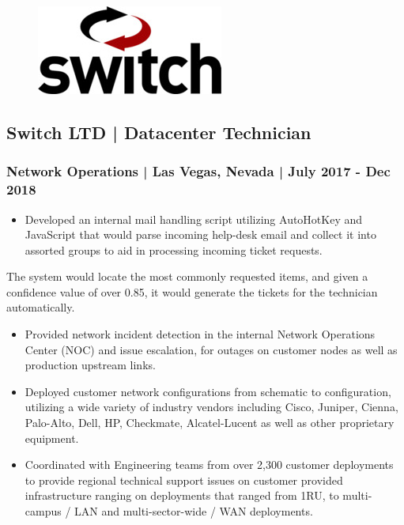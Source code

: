 \documentclass[letter,10pt]{article}
\begin{document}
\begin{figure}
\includegraphics[width=0.8\linewidth]{./img/50p_cr_switch.jpg}
\end{figure}

\subsection*{Switch LTD | Datacenter Technician}
\label{sec:orga775a4d}
\subsubsection*{Network Operations | Las Vegas, Nevada | July 2017 - Dec 2018}
\label{sec:org10a99c5}
\begin{itemize}
\item Developed an internal mail handling script utilizing AutoHotKey and JavaScript that would parse incoming help-desk email and collect it into assorted groups to aid in processing incoming ticket requests.
\end{itemize}
The system would locate the most commonly requested items, and given a confidence value of over 0.85, it would generate the tickets for the technician automatically. 
\begin{itemize}
\item Provided network incident detection in the internal Network Operations Center (NOC) and issue escalation, for outages on customer nodes as well as production upstream links.
\item Deployed customer network configurations from schematic to configuration, utilizing a wide variety of industry vendors including Cisco, Juniper, Cienna, Palo-Alto, Dell, HP, Checkmate, Alcatel-Lucent as well as other proprietary equipment.
\item Coordinated with Engineering teams from over 2,300 customer deployments to provide regional technical support issues on customer provided infrastructure ranging on deployments that ranged from 1RU, to multi-campus / LAN and multi-sector-wide / WAN deployments.
\end{itemize}
\end{document}
